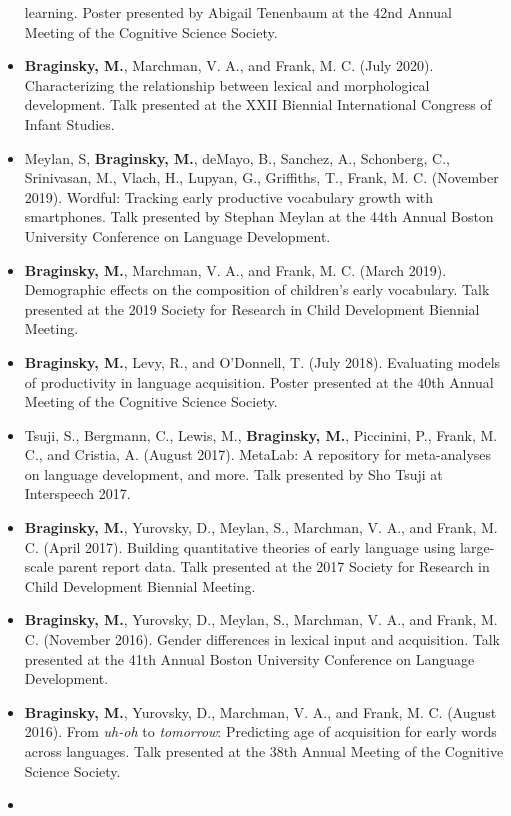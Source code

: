 \documentclass[11pt,]{article}
\begin{document}
\begin{itemize}
  learning. Poster presented by Abigail Tenenbaum at the 42nd Annual
  Meeting of the Cognitive Science Society.
\item
  \textbf{Braginsky, M.}, Marchman, V. A., and Frank, M. C. (July 2020).
  Characterizing the relationship between lexical and morphological
  development. Talk presented at the XXII Biennial International
  Congress of Infant Studies.
\item
  Meylan, S, \textbf{Braginsky, M.}, deMayo, B., Sanchez, A., Schonberg,
  C., Srinivasan, M., Vlach, H., Lupyan, G., Griffiths, T., Frank, M. C.
  (November 2019). Wordful: Tracking early productive vocabulary growth
  with smartphones. Talk presented by Stephan Meylan at the 44th Annual
  Boston University Conference on Language Development.
\item
  \textbf{Braginsky, M.}, Marchman, V. A., and Frank, M. C. (March
  2019). Demographic effects on the composition of children's early
  vocabulary. Talk presented at the 2019 Society for Research in Child
  Development Biennial Meeting.
\item
  \textbf{Braginsky, M.}, Levy, R., and O'Donnell, T. (July 2018).
  Evaluating models of productivity in language acquisition. Poster
  presented at the 40th Annual Meeting of the Cognitive Science Society.
\item
  Tsuji, S., Bergmann, C., Lewis, M., \textbf{Braginsky, M.}, Piccinini,
  P., Frank, M. C., and Cristia, A. (August 2017). MetaLab: A repository
  for meta-analyses on language development, and more. Talk presented by
  Sho Tsuji at Interspeech 2017.
\item
  \textbf{Braginsky, M.}, Yurovsky, D., Meylan, S., Marchman, V. A., and
  Frank, M. C. (April 2017). Building quantitative theories of early
  language using large-scale parent report data. Talk presented at the
  2017 Society for Research in Child Development Biennial Meeting.
\item
  \textbf{Braginsky, M.}, Yurovsky, D., Meylan, S., Marchman, V. A., and
  Frank, M. C. (November 2016). Gender differences in lexical input and
  acquisition. Talk presented at the 41th Annual Boston University
  Conference on Language Development.
\item
  \textbf{Braginsky, M.}, Yurovsky, D., Marchman, V. A., and Frank, M.
  C. (August 2016). From \emph{uh-oh} to \emph{tomorrow}: Predicting age
  of acquisition for early words across languages. Talk presented at the
  38th Annual Meeting of the Cognitive Science Society.
\item

\end{itemize}
\end{document}
